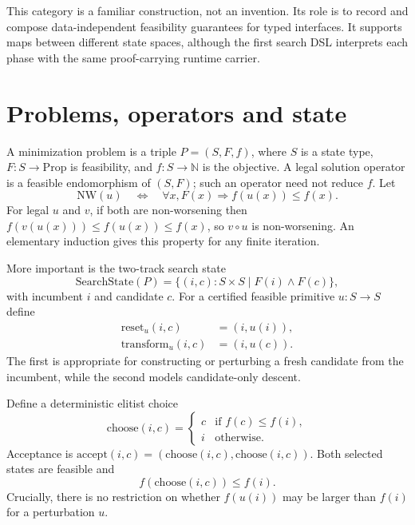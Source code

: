 \documentclass[11pt,a4paper]{article}
\begin{document}
This category is a familiar construction, not an invention. Its role is to
record and compose data-independent feasibility guarantees for typed
interfaces. It supports maps between different state spaces, although the
first search DSL interprets each phase with the same proof-carrying runtime
carrier.

\section{Problems, operators and state}
A minimization problem is a triple $P=(S,F,f)$, where $S$ is a state type,
$F:S\to\mathrm{Prop}$ is feasibility, and $f:S\to\mathbb{N}$ is the
objective. A legal solution operator is a feasible endomorphism of
$(S,F)$; such an operator need not reduce $f$. Let
\begin{equation}
 \mathrm{NW}(u)\quad\Longleftrightarrow\quad
 \forall x, F(x)\Rightarrow f(u(x))\le f(x).
\end{equation}
For legal $u$ and $v$, if both are non-worsening then
$f(v(u(x)))\le f(u(x))\le f(x)$, so $v\circ u$ is non-worsening.
An elementary induction gives this property for any finite iteration.

More important is the two-track search state
\begin{equation}
 \mathrm{SearchState}(P)=\{(i,c):S\times S\mid F(i)\land F(c)\},
\end{equation}
with incumbent $i$ and candidate $c$.
For a certified feasible primitive $u:S\to S$ define
\begin{align}
 \mathrm{reset}_u(i,c)&=(i,u(i)),\\
 \mathrm{transform}_u(i,c)&=(i,u(c)).
\end{align}
The first is appropriate for constructing or perturbing a fresh candidate
from the incumbent, while the second models candidate-only descent.

Define a deterministic elitist choice
\begin{equation}
 \mathrm{choose}(i,c)=
 \begin{cases}
 c &\text{if }f(c)\le f(i),\\
 i &\text{otherwise.}
 \end{cases}
\end{equation}
Acceptance is
$\mathrm{accept}(i,c)=(\mathrm{choose}(i,c),\mathrm{choose}(i,c))$.
Both selected states are feasible and
\begin{equation}
 f(\mathrm{choose}(i,c))\le f(i).
\end{equation}
Crucially, there is no restriction on whether $f(u(i))$ may be larger
than $f(i)$ for a perturbation $u$.
\end{document}
